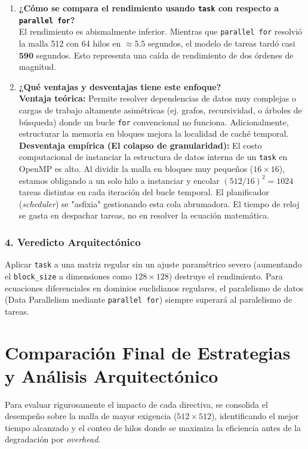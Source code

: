 \documentclass[11pt,a4paper]{article}
\begin{document}
\begin{enumerate}
    \item \textbf{¿Cómo se compara el rendimiento usando \texttt{task} con respecto a \texttt{parallel for}?} \\
    El rendimiento es abismalmente inferior. Mientras que \texttt{parallel for} resolvió la malla 512 con 64 hilos en $\approx 5.5$ segundos, el modelo de tareas tardó casi $\mathbf{590}$ segundos. Esto representa una caída de rendimiento de dos órdenes de magnitud. 

    \item \textbf{¿Qué ventajas y desventajas tiene este enfoque?} \\
    \textbf{Ventaja teórica:} Permite resolver dependencias de datos muy complejas o cargas de trabajo altamente asimétricas (ej. grafos, recursividad, o árboles de búsqueda) donde un bucle \texttt{for} convencional no funciona. Adicionalmente, estructurar la memoria en bloques mejora la localidad de caché temporal.\\
    \textbf{Desventaja empírica (El colapso de granularidad):} El costo computacional de instanciar la estructura de datos interna de un \texttt{task} en OpenMP es alto. Al dividir la malla en bloques muy pequeños ($16 \times 16$), estamos obligando a un solo hilo a instanciar y encolar $(512/16)^2 = 1024$ tareas distintas en cada iteración del bucle temporal. El planificador (\textit{scheduler}) se "asfixia" gestionando esta cola abrumadora. El tiempo de reloj se gasta en despachar tareas, no en resolver la ecuación matemática.
\end{enumerate}

\subsubsection*{4. Veredicto Arquitectónico}
Aplicar \texttt{task} a una matriz regular sin un ajuste paramétrico severo (aumentando el \texttt{block\_size} a dimensiones como $128 \times 128$) destruye el rendimiento. Para ecuaciones diferenciales en dominios euclidianos regulares, el paralelismo de datos (Data Parallelism mediante \texttt{parallel for}) siempre superará al paralelismo de tareas.

\section*{Comparación Final de Estrategias y Análisis Arquitectónico}

Para evaluar rigurosamente el impacto de cada directiva, se consolida el desempeño sobre la malla de mayor exigencia ($512 \times 512$), identificando el mejor tiempo alcanzado y el conteo de hilos donde se maximiza la eficiencia antes de la degradación por \textit{overhead}.
\end{document}
